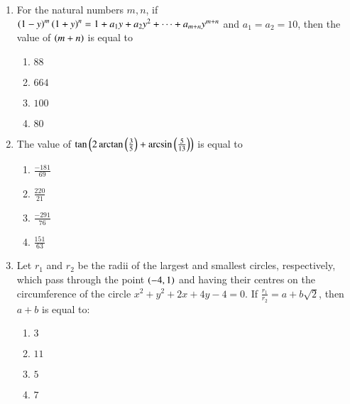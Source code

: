 \documentclass[journal]{IEEEtran}
\begin{document}
\begin{enumerate}
\setcounter{enumi}{0}
 
    \item For the natural numbers $m,n$, if $\left(1-y\right)^m\left(1+y\right)^n=1+a_1y+a_2y^2+\cdots+a_{m+n}y^{m+n}$ and $a_1=a_2=10$, then the value of $\left(m + n\right)$ is equal to

        \begin{multicols}{4}
            \begin{enumerate}
                \item $88$
                \item $664$
                \item $100$
                \item $80$
            \end{enumerate}
        \end{multicols}

    \item The value of $\tan\left(2\arctan\left(\frac{3}{5}\right)+\arcsin\left(\frac{5}{13}\right)\right)$ is equal to

        \begin{multicols}{4}
            \begin{enumerate}
                \item $\frac{-181}{69}$
                \item $\frac{220}{21}$
                \item $\frac{-291}{76}$
                \item $\frac{151}{63}$
            \end{enumerate}
        \end{multicols}

    \item Let $r_1$ and $r_2$ be the radii of the largest and smallest circles, respectively, which pass through the point $\left(-4,1\right)$ and having their centres on the circumference of the circle $x^2 +y^2+2x+4y-4=0$. If $\frac{r_1}{r_2}=a+b\sqrt{2}$, then $a+b$ is equal to:

        \begin{multicols}{4}
            \begin{enumerate}
                \item $3$
                \item $11$
                \item $5$
                \item $7$
            \end{enumerate}
        \end{multicols}


\end{enumerate}
\end{document}
